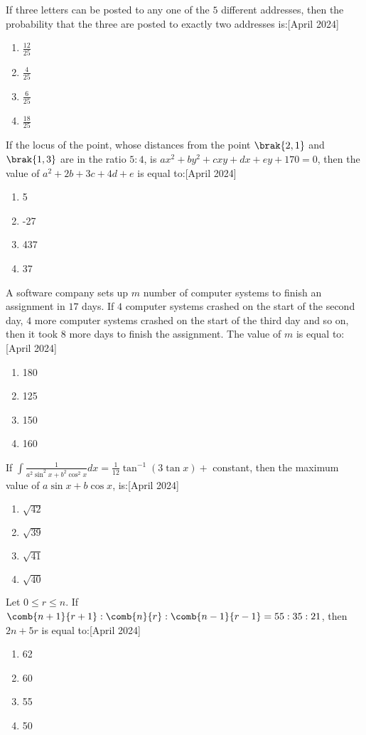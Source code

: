 \iffalse
\title{2024}
\author{ee24btech11009}
\section{mcq-single}
\fi
\item If three letters can be posted to any one of the $5 $ different addresses, then the probability that the three are posted to exactly two addresses is:\hfill{[April 2024]}
    \begin{enumerate}
    \item $\frac{12}{25}$
    \item $\frac{4}{25}$
    \item $\frac{6}{25}$
    \item $\frac{18}{25}$
\end{enumerate}
\item If the locus of the point, whose distances from the point $\brak{2, 1}$ and $\brak{1, 3}$ are in the ratio $5: 4$, is
$ax^2+by^2+cxy+dx+ey+170=0$, then the value of $a^2+2b+3c+4d+e$ is equal to:\hfill{[April 2024]}
\begin{enumerate}
\item 5
\item -27
\item 437
\item 37
\end{enumerate}
\item A software company sets up $m$ number of computer systems to finish an assignment in $17$ days. If
$4$ computer systems crashed on the start of the second day, $4$ more computer systems crashed on
the start of the third day and so on, then it took $8$ more days to finish the assignment. The value of
$m$ is equal to:\hfill{[April 2024]}
\begin{enumerate}
\item 180
\item 125
\item 150
\item 160
\end{enumerate}
\item If $\int\frac{1}{a^{2}\sin^{2}x+b^{2}\cos^{2}x}dx=\frac{1}{12}\tan^{-1}(3\tan x)+$ constant, then the maximum value of $a\sin x+b\cos x$, is:\hfill{[April 2024]}

\begin{enumerate}
\item $\sqrt{42}$
\item $\sqrt{39}$
\item $\sqrt{41}$
\item $\sqrt{40}$
\end{enumerate}

\item Let $0\leq r\leq n$. If $\comb{n+1}{r+1}:\comb{n}{r}:\comb{n-1}{r-1}=55:35:21$, then $2n+5r$ is equal to:\hfill{[April 2024]}
\begin{enumerate}
\item 62
\item 60
\item 55
\item 50
\end{enumerate}
